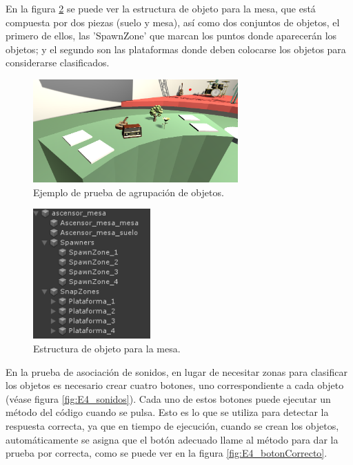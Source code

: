 En la figura \ref{fig:E4_mesa} se puede ver la estructura de objeto para la mesa, que está compuesta por dos piezas (suelo y mesa), así como dos conjuntos de objetos, el primero de ellos, las 'SpawnZone' que marcan los puntos donde aparecerán los objetos; y el segundo son las plataformas donde deben colocarse los objetos para considerarse clasificados.



\begin{figure}
  \centering
    \includegraphics[width=0.7\textwidth]{04.Desarrollo/04.Entrega4/02.Iteracion4_2/00.Figuras/06.asociacion.png}
    \caption{Ejemplo de prueba de agrupación de objetos.}
    \label{fig:E4_asociacion}
\end{figure}


\begin{figure}
  \centering
    \includegraphics[width=0.4\textwidth]{04.Desarrollo/04.Entrega4/02.Iteracion4_2/00.Figuras/07.mesa.png}
    \caption{Estructura de objeto para la mesa.}
    \label{fig:E4_mesa}
\end{figure}



En la prueba de asociación de sonidos, en lugar de necesitar zonas para clasificar los objetos es necesario crear cuatro botones, uno correspondiente a cada objeto (véase figura \ref{fig:E4_sonidos}). Cada uno de estos botones puede ejecutar un método del código cuando se pulsa. Esto es lo que se utiliza para detectar la respuesta correcta, ya que en tiempo de ejecución, cuando se crean los objetos, automáticamente se asigna que el botón adecuado llame al método para dar la prueba por correcta, como se puede ver en la figura \ref{fig:E4_botonCorrecto}.


